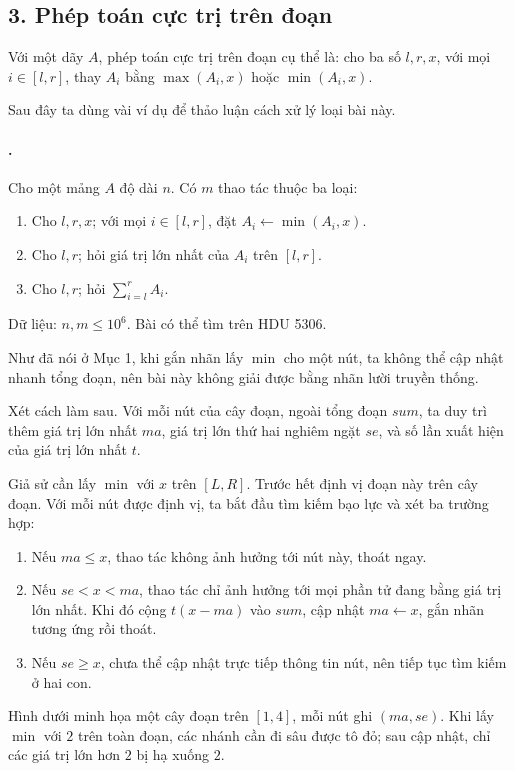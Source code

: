 \documentclass[11pt]{article}
\begin{document}
\subsection*{3. Phép toán cực trị trên đoạn}

Với một dãy \(A\), phép toán cực trị trên đoạn cụ thể là: cho ba số \(l,r,x\),
với mọi \(i\in[l,r]\), thay \(A_i\) bằng \(\max(A_i,x)\) hoặc
\(\min(A_i,x)\).

Sau đây ta dùng vài ví dụ để thảo luận cách xử lý loại bài này.

\paragraph{.}
Cho một mảng \(A\) độ dài \(n\). Có \(m\) thao tác thuộc ba loại:
\begin{enumerate}
  \item Cho \(l,r,x\); với mọi \(i\in[l,r]\), đặt
  \(A_i\leftarrow \min(A_i,x)\).
  \item Cho \(l,r\); hỏi giá trị lớn nhất của \(A_i\) trên \([l,r]\).
  \item Cho \(l,r\); hỏi \(\sum_{i=l}^{r}A_i\).
\end{enumerate}
Dữ liệu: \(n,m\le 10^6\). Bài có thể tìm trên HDU 5306.

Như đã nói ở Mục 1, khi gắn nhãn lấy \(\min\) cho một nút, ta không thể cập
nhật nhanh tổng đoạn, nên bài này không giải được bằng nhãn lười truyền thống.

Xét cách làm sau. Với mỗi nút của cây đoạn, ngoài tổng đoạn \(\mathit{sum}\),
ta duy trì thêm giá trị lớn nhất \(ma\), giá trị lớn thứ hai nghiêm ngặt
\(se\), và số lần xuất hiện của giá trị lớn nhất \(t\).

Giả sử cần lấy \(\min\) với \(x\) trên \([L,R]\). Trước hết định vị đoạn này
trên cây đoạn. Với mỗi nút được định vị, ta bắt đầu tìm kiếm bạo lực và xét
ba trường hợp:
\begin{enumerate}
  \item Nếu \(ma\le x\), thao tác không ảnh hưởng tới nút này, thoát ngay.
  \item Nếu \(se<x<ma\), thao tác chỉ ảnh hưởng tới mọi phần tử đang bằng
  giá trị lớn nhất. Khi đó cộng \(t(x-ma)\) vào \(\mathit{sum}\), cập nhật
  \(ma\leftarrow x\), gắn nhãn tương ứng rồi thoát.
  \item Nếu \(se\ge x\), chưa thể cập nhật trực tiếp thông tin nút, nên tiếp
  tục tìm kiếm ở hai con.
\end{enumerate}
Hình dưới minh họa một cây đoạn trên \([1,4]\), mỗi nút ghi \((ma,se)\). Khi
lấy \(\min\) với \(2\) trên toàn đoạn, các nhánh cần đi sâu được tô đỏ; sau cập
nhật, chỉ các giá trị lớn hơn \(2\) bị hạ xuống \(2\).
\end{document}
